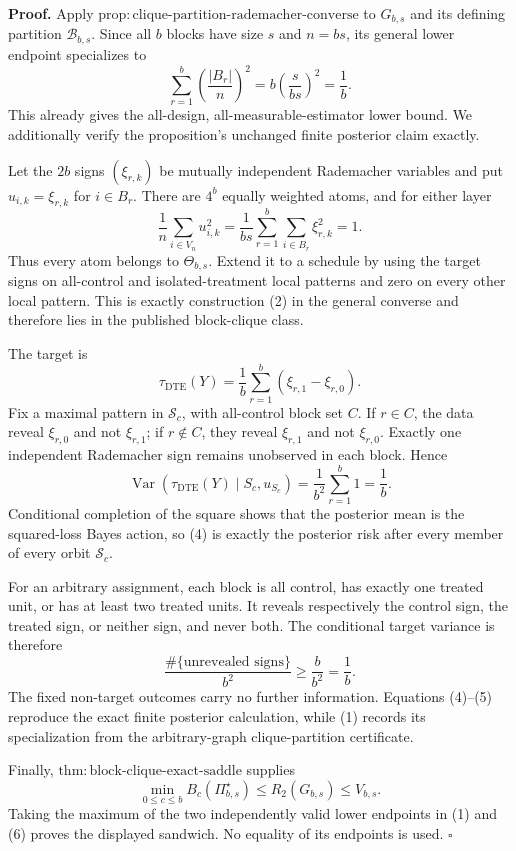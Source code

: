 \textbf{Proof.}
Apply \(\mathrm{prop{:}clique\text{-}partition\text{-}rademacher\text{-}converse}\) to \(G_{b,s}\) and its defining partition \(\mathcal B_{b,s}\). Since all \(b\) blocks have size \(s\) and \(n=bs\), its general lower endpoint specializes to
\[
\sum_{r=1}^b\left(\frac{|B_r|}{n}\right)^2
=b\left(\frac{s}{bs}\right)^2=\frac1b.
\tag{1}
\]
This already gives the all-design, all-measurable-estimator lower bound. We additionally verify the proposition's unchanged finite posterior claim exactly.

Let the \(2b\) signs \((\xi_{r,k})\) be mutually independent Rademacher variables and put \(u_{i,k}=\xi_{r,k}\) for \(i\in B_r\). There are \(4^b\) equally weighted atoms, and for either layer
\[
\frac1n\sum_{i\in V_n}u_{i,k}^2
=\frac1{bs}\sum_{r=1}^b\sum_{i\in B_r}\xi_{r,k}^2=1.
\tag{2}
\]
Thus every atom belongs to \(\Theta_{b,s}\). Extend it to a schedule by using the target signs on all-control and isolated-treatment local patterns and zero on every other local pattern. This is exactly construction (2) in the general converse and therefore lies in the published block-clique class.

The target is
\[
\tau_{\mathrm{DTE}}(Y)=\frac1b\sum_{r=1}^b(\xi_{r,1}-\xi_{r,0}).
\tag{3}
\]
Fix a maximal pattern in \(\mathcal S_c\), with all-control block set \(C\). If \(r\in C\), the data reveal \(\xi_{r,0}\) and not \(\xi_{r,1}\); if \(r\notin C\), they reveal \(\xi_{r,1}\) and not \(\xi_{r,0}\). Exactly one independent Rademacher sign remains unobserved in each block. Hence
\[
\operatorname{Var}\!\left(\tau_{\mathrm{DTE}}(Y)\mid S_c,u_{S_c}\right)
=\frac1{b^2}\sum_{r=1}^b1=\frac1b.
\tag{4}
\]
Conditional completion of the square shows that the posterior mean is the squared-loss Bayes action, so (4) is exactly the posterior risk after every member of every orbit \(\mathcal S_c\).

For an arbitrary assignment, each block is all control, has exactly one treated unit, or has at least two treated units. It reveals respectively the control sign, the treated sign, or neither sign, and never both. The conditional target variance is therefore
\[
\frac{\#\{\text{unrevealed signs}\}}{b^2}\geq\frac b{b^2}=\frac1b.
\tag{5}
\]
The fixed non-target outcomes carry no further information. Equations (4)--(5) reproduce the exact finite posterior calculation, while (1) records its specialization from the arbitrary-graph clique-partition certificate.

Finally, \(\mathrm{thm{:}block\text{-}clique\text{-}exact\text{-}saddle}\) supplies
\[
\min_{0\leq c\leq b}B_c(\Pi_{b,s}^{\star})
\leq R_2(G_{b,s})\leq V_{b,s}.
\tag{6}
\]
Taking the maximum of the two independently valid lower endpoints in (1) and (6) proves the displayed sandwich. No equality of its endpoints is used. \(\square\)